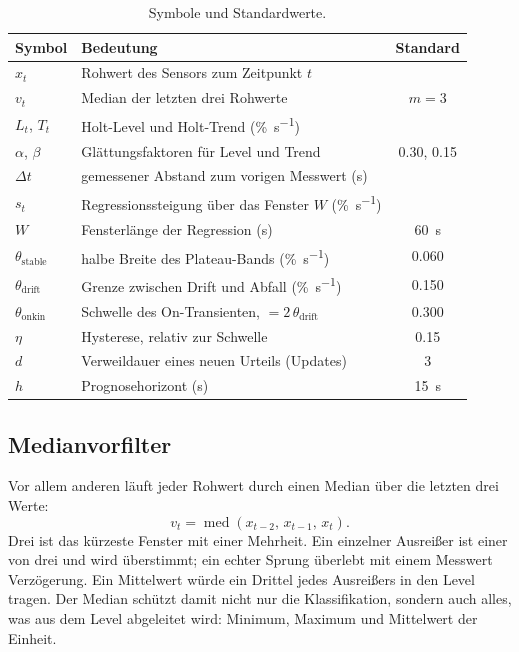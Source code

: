 \documentclass[11pt,a4paper]{article}
\newcommand{\pers}{\si{\percent\per\second}}
\begin{document}
\begin{table}[H]
  \centering\small
  \caption{Symbole und Standardwerte.}
  \label{tab:symbols}
  \begin{tabular}{@{}llc@{}}
    \toprule
    Symbol & Bedeutung & Standard \\
    \midrule
    $x_t$ & Rohwert des Sensors zum Zeitpunkt $t$ & \\
    $v_t$ & Median der letzten drei Rohwerte & $m = 3$ \\
    $L_t$, $T_t$ & Holt-Level und Holt-Trend (\pers) & \\
    $\alpha$, $\beta$ & Glättungsfaktoren für Level und Trend & \num{0.30}, \num{0.15} \\
    $\Delta t$ & gemessener Abstand zum vorigen Messwert (s) & \\
    $s_t$ & Regressionssteigung über das Fenster $W$ (\pers) & \\
    $W$ & Fensterlänge der Regression (s) & \SI{60}{\second} \\
    $\theta_{\mathrm{stable}}$ & halbe Breite des Plateau-Bands (\pers) & \num{0.060} \\
    $\theta_{\mathrm{drift}}$ & Grenze zwischen Drift und Abfall (\pers) & \num{0.150} \\
    $\theta_{\mathrm{onkin}}$ & Schwelle des On-Transienten, $= 2\,\theta_{\mathrm{drift}}$ & \num{0.300} \\
    $\eta$ & Hysterese, relativ zur Schwelle & \num{0.15} \\
    $d$ & Verweildauer eines neuen Urteils (Updates) & 3 \\
    $h$ & Prognosehorizont (s) & \SI{15}{\second} \\
    \bottomrule
  \end{tabular}
\end{table}

\subsection{Medianvorfilter}

Vor allem anderen läuft jeder Rohwert durch einen Median über die letzten drei
Werte:
\begin{equation}
  v_t = \operatorname{med}\left(x_{t-2},\, x_{t-1},\, x_t\right).
\end{equation}
Drei ist das kürzeste Fenster mit einer Mehrheit. Ein einzelner Ausreißer ist
einer von drei und wird überstimmt; ein echter Sprung überlebt mit einem
Messwert Verzögerung. Ein Mittelwert würde ein Drittel jedes Ausreißers in den
Level tragen. Der Median schützt damit nicht nur die Klassifikation, sondern
auch alles, was aus dem Level abgeleitet wird: Minimum, Maximum und Mittelwert
der Einheit.
\end{document}
